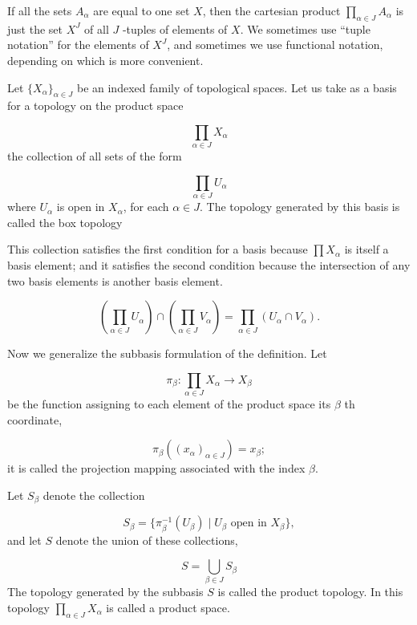 If all the sets \(A_{\alpha }\) are equal to one set \(X\), then the cartesian product \(\mathop{\prod }\limits_{{\alpha \in J}}A_{\alpha }\) is just the set \(X^{J}\) of all \(J\) -tuples of elements of \(X\). We sometimes use ``tuple notation'' for the elements of \(X^{J}\), and sometimes we use functional notation, depending on which is more convenient.

\begin{definition}
 Let \({\{ X_{\alpha }\} }_{\alpha \in J}\) be an indexed family of topological spaces. Let us take as a basis for a topology on the product space

 \[
 \mathop{\prod }\limits_{{\alpha \in J}}X_{\alpha }
 \]
 the collection of all sets of the form

 \[
 \mathop{\prod }\limits_{{\alpha \in J}}U_{\alpha }
 \]
 where \(U_{\alpha }\) is open in \(X_{\alpha }\), for each \(\alpha \in J\). The topology generated by this basis is called the box topology
\end{definition}

This collection satisfies the first condition for a basis because \(\prod {X}_{\alpha }\) is itself a basis element; and it satisfies the second condition because the intersection of any two basis elements is another basis element.

\[
( {\mathop{\prod }\limits_{{\alpha \in J}}U_{\alpha }}) \cap ( {\mathop{\prod }\limits_{{\alpha \in J}}V_{\alpha }}) = \mathop{\prod }\limits_{{\alpha \in J}}( {U_{\alpha } \cap {V}_{\alpha }}).
\]

Now we generalize the subbasis formulation of the definition. Let

\[
{\pi }_{\beta } : \mathop{\prod }\limits_{{\alpha \in J}}X_{\alpha } \rightarrow {X}_{\beta }
\]
be the function assigning to each element of the product space its \(\beta\) th coordinate,

\[
{\pi }_{\beta }( {( x_{\alpha }) }_{\alpha \in J}) = x_{\beta };
\]
it is called the projection mapping associated with the index \(\beta\).

\begin{definition}
 Let \(S_{\beta }\) denote the collection

 \[
 S_{\beta } = \{ {{\pi }_{\beta }^{-1}( U_{\beta }) \mid {U}_{\beta }\text{ open in }X_{\beta }}\},
 \]
 and let \(S\) denote the union of these collections,

 \[
 S = \mathop{\bigcup }\limits_{{\beta \in J}}S_{\beta }
 \]
 The topology generated by the subbasis \(S\) is called the product topology. In this topology \(\mathop{\prod }\limits_{{\alpha \in J}}X_{\alpha }\) is called a product space.
\end{definition}

